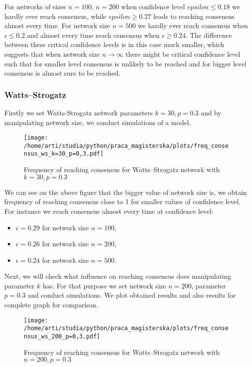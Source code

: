 \documentclass{article}
\begin{document}
For networks of sizes $n=100$, $n=200$ when confidence level $epsilon\leq0.18$ we hardly ever reach consensus, while $epsilon\geq0.27$ leads to reaching consensus almost every time.
For network size $n=500$ we hardly ever reach consensus when $\epsilon\leq0.2$ and almost every time reach censensus when $\epsilon\geq0.24$. The difference between these critical confidence levels is in this case much smaller, which suggests that when network size $n \to \infty$ there might be critical confidence level such that for smaller level consensus is unlikely to be reached and for bigger level consensus is almost sure to be reached. 

\subsubsection{Watts--Strogatz}

Firstly we set Watts-Strogatz network parameters $k=30, p=0.3$ and by manipulating network size, we conduct simulations of a model.

\begin{figure}[H]
		\centering
		\texttt{[image: /home/arti/studia/python/praca\_magisterska/plots/freq\_consensus\_ws\_k=30\_p=0,3.pdf]}
		\caption{Frequency of reaching consensus for Watts--Strogatz network with $k=30, p=0.3$}
\end{figure}

We can see on the above figure that the bigger value of network size is, we obtain frequency of reaching consensus close to 1 for smaller values of confidence level. For instance we reach consensus almost every time at confidence level:
\begin{itemize}
\item  $\epsilon=0.29$ for network size $n=100$,
\item  $\epsilon=0.26$ for network size $n=200$,
\item  $\epsilon=0.24$ for network size $n=500$.
\end{itemize}
\indent

Next, we will check what influence on reaching consensus does manipulating parameter $k$ has. For that purpose we set network size $n=200$, parameter $p=0.3$ and conduct simulations. We plot obtained results and also results for complete graph for comparison.

\begin{figure}[H]
		\centering
		\texttt{[image: /home/arti/studia/python/praca\_magisterska/plots/freq\_consensus\_ws\_200\_p=0,3.pdf]}
		\caption{Frequency of reaching consensus for Watts--Strogatz network with $n=200, p=0.3$}
		\label{freq_ws}
\end{figure}
\end{document}
